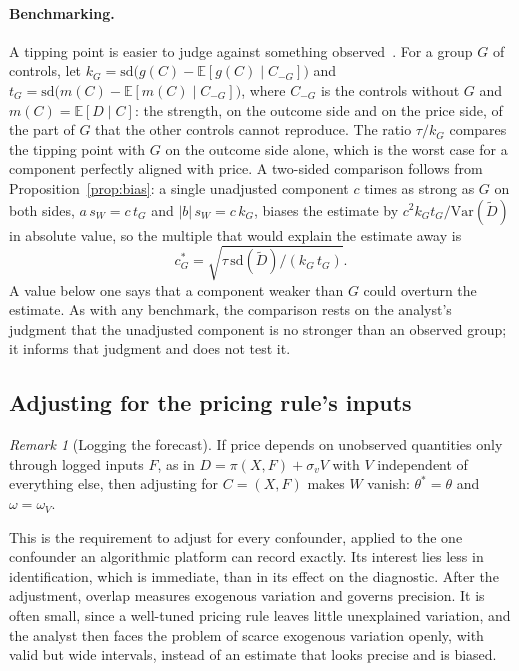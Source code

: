 \documentclass[11pt]{article}
\theoremstyle{remark}
\newtheorem{remark}{Remark}
\newcommand{\E}{\mathbb{E}}
\newcommand{\Var}{\mathrm{Var}}
\begin{document}
\paragraph{Benchmarking.} A tipping point is easier to judge against something observed~\citep{cinelli2020}. For a group $G$ of controls, let $k_G = \mathrm{sd}\bigl(g(C) - \E[g(C) \mid C_{-G}]\bigr)$ and $t_G = \mathrm{sd}\bigl(m(C) - \E[m(C) \mid C_{-G}]\bigr)$, where $C_{-G}$ is the controls without $G$ and $m(C) = \E[D \mid C]$: the strength, on the outcome side and on the price side, of the part of $G$ that the other controls cannot reproduce. The ratio $\tau / k_G$ compares the tipping point with $G$ on the outcome side alone, which is the worst case for a component perfectly aligned with price. A two-sided comparison follows from Proposition~\ref{prop:bias}: a single unadjusted component $c$ times as strong as $G$ on both sides, $a\,s_W = c\,t_G$ and $|b|\,s_W = c\,k_G$, biases the estimate by $c^2 k_G t_G / \Var(\tilde D)$ in absolute value, so the multiple that would explain the estimate away is
\begin{equation}
c^\ast_G = \sqrt{\tau\, \mathrm{sd}(\tilde D) / (k_G\, t_G)}.
\label{eq:benchmark}
\end{equation}
A value below one says that a component weaker than $G$ could overturn the estimate. As with any benchmark, the comparison rests on the analyst's judgment that the unadjusted component is no stronger than an observed group; it informs that judgment and does not test it.

\subsection{Adjusting for the pricing rule's inputs}

\begin{remark}[Logging the forecast]
\label{rem:logging}
If price depends on unobserved quantities only through logged inputs $F$, as in $D = \pi(X, F) + \sigma_v V$ with $V$ independent of everything else, then adjusting for $C = (X, F)$ makes $W$ vanish: $\theta^\ast = \theta$ and $\omega = \omega_V$.
\end{remark}

This is the requirement to adjust for every confounder, applied to the one confounder an algorithmic platform can record exactly. Its interest lies less in identification, which is immediate, than in its effect on the diagnostic. After the adjustment, overlap measures exogenous variation and governs precision. It is often small, since a well-tuned pricing rule leaves little unexplained variation, and the analyst then faces the problem of scarce exogenous variation openly, with valid but wide intervals, instead of an estimate that looks precise and is biased.
\end{document}
